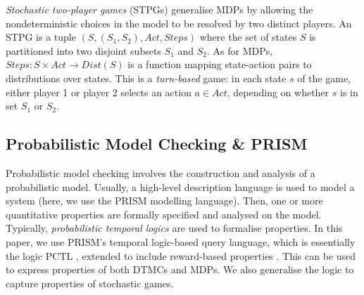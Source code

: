 \documentclass{llncs}
\begin{document}
\emph{Stochastic two-player games} (STPGs) generalise MDPs by allowing the nondeterministic choices
in the model to be resolved by two distinct players.
An STPG is a tuple $(S,(S_1,S_2),Act,Steps)$
where the set of states $S$ is partitioned into two disjoint subsets $S_1$ and $S_2$.
As for MDPs, $Steps:S\times Act\rightarrow Dist(S)$ is a function mapping
state-action pairs to distributions over states.
This is a \emph{turn-based} game: in each state $s$ of the game,
either player 1 or player 2 selects an action $a\in Act$,
depending on whether $s$ is in set $S_1$ or $S_2$.
\subsection{Probabilistic Model Checking \& PRISM}

Probabilistic model checking involves the construction and analysis of a probabilistic model.
Usually, a high-level description language is used to model a system
(here, we use the PRISM \cite{KNP11} modelling language).
Then, one or more quantitative properties are formally specified and analysed on the model.
Typically, \emph{probabilistic temporal logics} are used to formalise properties.
In this paper, we use PRISM's temporal logic-based query language,
which is essentially the logic PCTL \cite{HJ94},
extended to include reward-based properties \cite{KNP07a,FKNP11}.
This can be used to express properties of both DTMCs and MDPs.
We also generalise the logic to capture properties of stochastic games.
\end{document}
